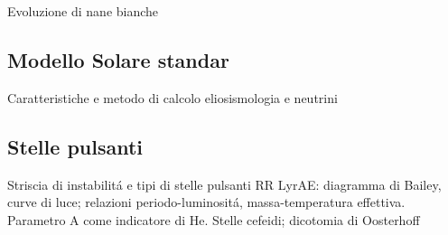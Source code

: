 \begin{frame}{Evoluzione di nane bianche}

\end{frame}

\subsection{Modello Solare standar}

\begin{frame}{Caratteristiche e metodo di calcolo}
eliosismologia e neutrini
\end{frame}

\subsection{Stelle pulsanti}

\begin{frame}{Striscia di instabilit\'a e tipi di stelle pulsanti}
RR LyrAE: diagramma di Bailey, curve di luce; relazioni periodo-luminosit\'a, massa-temperatura effettiva.
Parametro A come indicatore di He.
Stelle cefeidi; dicotomia di Oosterhoff
\end{frame}